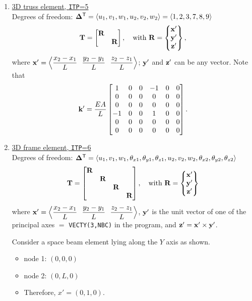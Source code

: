 \begin{enumerate}[leftmargin=*]
  \item \underline{3D truss element, \texttt{ITP}=5}\\
    Degrees of freedom: $\bm{\Delta}^{\mathsf{T}} = \langle u_1, v_1, w_1, u_2, v_2, w_2\rangle = \langle 1, 2, 3, 7, 8, 9\rangle$
    \begin{equation*}
      \mathbf{T} = \begin{bmatrix}\mathbf{R} & \\ & \mathbf{R}\end{bmatrix},\quad\text{with } \mathbf{R} = \begin{Bmatrix}\mathbf{x}'\\ \mathbf{y}'\\ \mathbf{z}'\end{Bmatrix},
    \end{equation*}
    where $\mat{x}' = \Bigl\langle\dfrac{x_2-x_1}{L}\ \ \dfrac{y_2-y_1}{L}\ \ \dfrac{z_2-z_1}{L}\Bigr\rangle$; $\mathbf{y}'$ and $\mathbf{z}'$ can be any vector. Note that
    \begin{equation*}
      \mathbf{k}' = \frac{EA}{L}\begin{bmatrix}1 & 0 & 0 & -1 & 0 & 0\\ 0 & 0 & 0 & 0 & 0 & 0\\ 0 & 0 & 0 & 0 & 0 & 0\\ -1 & 0 & 0 & 1 & 0 & 0\\ 0 & 0 & 0 & 0 & 0 & 0\\ 0 & 0 & 0 & 0 & 0 & 0\end{bmatrix}.
    \end{equation*}

  \item \underline{3D frame element, \texttt{ITP}=6}\\
    Degrees of freedom: $\bm{\Delta}^{\mathsf{T}} = \langle u_1, v_1, w_1, \theta_{x1}, \theta_{y1}, \theta_{z1}, u_2, v_2, w_2, \theta_{x2}, \theta_{y2}, \theta_{z2}\rangle$
    \begin{equation*}
      \mathbf{T} = \begin{bmatrix}\mathbf{R} & & & \\ & \mathbf{R} & & \\ & & \mathbf{R} & \\ & & & \mathbf{R}\end{bmatrix},\quad\text{with } \mathbf{R} = \begin{Bmatrix}\mathbf{x}'\\ \mathbf{y}'\\ \mathbf{z}'\end{Bmatrix}
    \end{equation*}
    where $\mat{x}' = \Bigl\langle\dfrac{x_2-x_1}{L}\ \ \dfrac{y_2-y_1}{L}\ \ \dfrac{z_2-z_1}{L}\Bigr\rangle$, $\mathbf{y}'$ is the unit vector of one of the principal axes $=$ \texttt{VECTY(3,NBC)} in the program, and $\mathbf{z}' = \mathbf{x}'\times\mathbf{y}'$.

    \begin{minipage}[t]{0.55\linewidth}
      \vspace{0pt}
      Consider a space beam element lying along the $Y$ axis as shown.
      \begin{itemize}
        \item node 1: $(0,0,0)$
        \item node 2: $(0,L,0)$
        \item Therefore, $x' = (0,1,0)$.
      \end{itemize}
    \end{minipage}\hfill
    \begin{minipage}[t]{0.42\linewidth}
      \vspace{0pt}\centering
    \end{minipage}


\end{enumerate}
